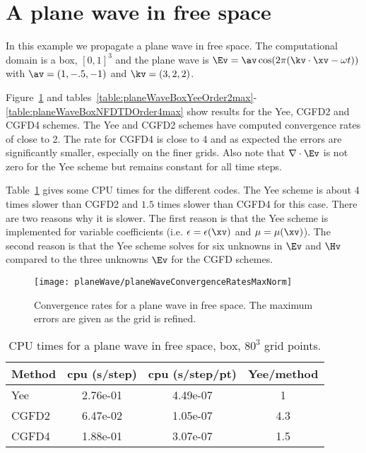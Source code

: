\documentclass[11pt]{article}
\newcommand{\grad}{\nabla}
\begin{document}


\clearpage
\section{A plane wave in free space}\label{sec:planeWave}

In this example we propagate a plane wave in free space. The computational domain is a box, $[0,1]^3$
and the plane wave is $\Ev = \av \cos(2\pi(\kv\cdot\xv - \omega t) )$ with
$\av=( 1, -.5, -1)$ and $\kv=(3,2,2)$.

Figure~\ref{fig:planeWaveConvergenceRatesMaxNorm} 
and tables~\ref{table:planeWaveBoxYeeOrder2max}-\ref{table:planeWaveBoxNFDTDOrder4max} show
results for the Yee, CGFD2 and CGFD4 schemes. The Yee and CGFD2 schemes have
computed convergence rates of close to 2. The rate for CGFD4 is close to 4 and as expected the errors are
significantly smaller, especially on the finer grids. Also note that $\grad\cdot\Ev$ is not zero
for the Yee scheme but remains constant for all time steps.

Table~\ref{tab:planeWaveCPU} gives some CPU times for the different codes. The Yee scheme
is about 4 times slower than CGFD2 and $1.5$ times slower than CGFD4 for this case. There are two reasons
why it is slower. The first reason is that the Yee scheme is implemented for variable coefficients
(i.e. $\epsilon=\epsilon(\xv)$ and $\mu=\mu(\xv)$). The second reason is that the Yee scheme 
solves for six unknowns in $\Ev$ and $\Hv$ compared to the three unknowns $\Ev$ for the CGFD schemes.


\begin{figure}[hbt]
\begin{center}\small
\texttt{[image: planeWave/planeWaveConvergenceRatesMaxNorm]}
%
\caption{Convergence rates for a plane wave in free space. The maximum errors are given as the grid is refined.}
\label{fig:planeWaveConvergenceRatesMaxNorm}
\end{center}
\end{figure}

\begin{table}[hbt]
\begin{center}
\begin{tabular}{|l|c|c|c|}\hline
Method  & cpu (s/step) & cpu (s/step/pt) &  Yee/method   \\ \hline
Yee     &   2.76e-01   &   4.49e-07      &    1     \\
CGFD2   &   6.47e-02   &   1.05e-07      &    4.3    \\
CGFD4   &   1.88e-01   &   3.07e-07      &    1.5   \\ \hline
\end{tabular}
\end{center}
\caption{ CPU times for a plane wave in free space, box, $80^3$ grid points.}\label{tab:planeWaveCPU}
\end{table}
\end{document}
